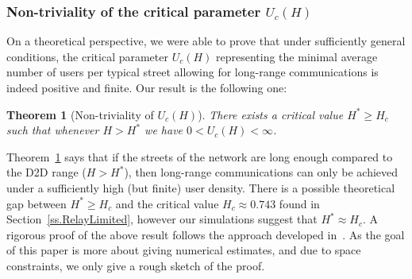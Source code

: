 \documentclass[conference]{IEEEtran}
\newtheorem{theorem}{Theorem}
\begin{document}
\subsubsection{Non-triviality of the critical parameter $U_c(H)$}
On a theoretical perspective, we were able to prove that under sufficiently general conditions, the critical parameter $U_c(H)$ representing the minimal average number of users per typical street allowing for long-range communications is indeed positive and finite. Our result is the following one:
\\
\begin{theorem}[Non-triviality of $U_c(H)$]\label{critical-U-thm}
There exists a critical value $H^{*} \geq H_c$ such that whenever $H > H^{*}$ we have   \hbox{$0<U_c(H)<\infty$}. 
\end{theorem}
\medskip
Theorem~\ref{critical-U-thm} %
says that if the streets of the network are long enough compared to the D2D range ($H>H^{*}$),
then long-range communications can only be achieved under a sufficiently high (but finite) user density.
There is a possible theoretical gap between $H^*\ge H_c$ and the critical value $H_c\approx 0.743$ found in Section~\ref{ss.RelayLimited}, however our simulations suggest that $H^*\approx H_c$.
A rigorous proof of the above result %
follows the approach developed in~\cite{hirsch_continuum_2017}.
As the goal of this paper is more about giving numerical estimates, and due to space constraints, we only give a rough sketch of the proof.
\end{document}
